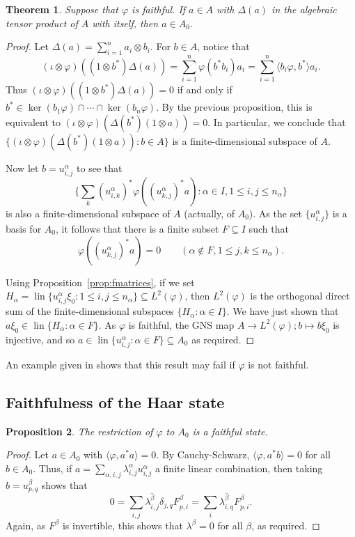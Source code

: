 \documentclass[twoside,a4paper,12pt]{article}
\theoremstyle{plain}
\newtheorem{proposition}{Proposition}[section]
\newtheorem{theorem}[proposition]{Theorem}
\theoremstyle{definition}
\newcommand{\ip}[2]{\langle #1,#2 \rangle}
\newcommand{\lin}{\operatorname{lin}}
\begin{document}
\begin{theorem}\label{thm:when_in_poly}
Suppose that $\varphi$ is faithful.  If $a\in A$ with $\Delta(a)$ in
the algebraic tensor product of $A$ with itself, then $a\in A_0$.
\end{theorem}
\begin{proof}
Let $\Delta(a) = \sum_{i=1}^n a_i \otimes b_i$.  For $b\in A$, notice that
\[ (\iota\otimes\varphi)((1\otimes b^*)\Delta(a))
= \sum_{i=1}^n \varphi(b^*b_i) a_i
= \sum_{i=1}^n \ip{b_i\varphi}{b^*} a_i. \]
Thus $(\iota\otimes\varphi)((1\otimes b^*)\Delta(a))=0$ if and only if
$b^* \in \ker(b_1\varphi)\cap\cdots\cap\ker(b_n\varphi)$.  By the previous
proposition, this is equivalent to
$(\iota\otimes\varphi)(\Delta(b^*)(1\otimes a))=0$.  In particular,
we conclude that $\{ (\iota\otimes\varphi)(\Delta(b^*)(1\otimes a)) :
b\in A \}$ is a finite-dimensional subspace of $A$.

Now let $b=u^\alpha_{i,j}$ to see that
\[ \Big\{ \sum_k (u^\alpha_{i,k})^* \varphi((u^\alpha_{k,j})^* a) : \alpha\in I,
1\leq i,j\leq n_\alpha \Big\} \]
is also a finite-dimensional subspace of $A$ (actually, of $A_0$).
As the set $\{ u^\alpha_{i,j} \}$ is a basis for $A_0$, it follows that
there is a finite subset $F\subseteq I$ such that
\[ \varphi((u^\alpha_{k,j})^* a) = 0 \qquad
(\alpha\not\in F, 1\leq j,k\leq n_\alpha). \]

Using Proposition~\ref{prop:fmatrices}, if we set $H_\alpha = \lin\{
u^\alpha_{i,j} \xi_0 : 1\leq i,j\leq n_\alpha \} \subseteq L^2(\varphi)$,
then $L^2(\varphi)$ is the orthogonal direct sum of the finite-dimensional
subspaces $\{ H_\alpha : \alpha\in I \}$.  We have just shown that
$a\xi_0 \in \lin \{ H_\alpha : \alpha\in F \}$.  As $\varphi$ is faithful,
the GNS map $A\rightarrow L^2(\varphi); b\mapsto b\xi_0$ is injective, and
so $a \in \lin \{ u^\alpha_{i,j} : \alpha\in F \} \subseteq A_0$ as required.
\end{proof}

An example given in \cite{ks} shows that this result may fail if $\varphi$
is not faithful.





\subsection{Faithfulness of the Haar state}\label{sec:faith_haar}

\begin{proposition}\label{prop:haarfaithhopf}
The restriction of $\varphi$ to $A_0$ is a faithful state.
\end{proposition}
\begin{proof}
Let $a\in A_0$ with $\ip{\varphi}{a^*a}=0$.  By Cauchy-Schwarz,
$\ip{\varphi}{a^*b}=0$ for all $b\in A_0$.  Thus, if
$a = \sum_{\alpha,i,j} \lambda^\alpha_{i,j} u^\alpha_{i,j}$ a finite
linear combination, then taking $b=u^\beta_{p,q}$ shows that
\[ 0 = \sum_{i,j} \overline{\lambda^\beta_{i,j}}
\delta_{j,q} F^\beta_{p,i} = \sum_i \overline{\lambda^\beta_{i,q}}
F^\beta_{p,i}. \]
Again, as $F^\beta$ is invertible, this shows that $\lambda^\beta=0$ for
all $\beta$, as required.
\end{proof}
\end{document}
